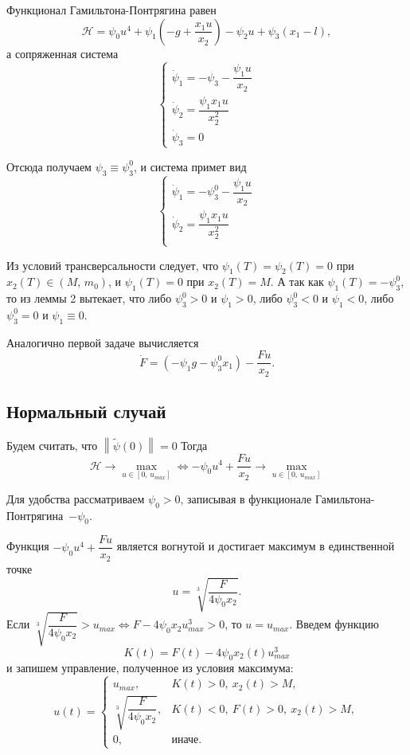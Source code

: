 \documentclass[16pt]{article}
\newcommand\Norm[1]{\left\| #1 \right\|}
\begin{document}
Функционал Гамильтона-Понтрягина равен 
$$\mathcal{H} = \psi_0 u^4 + \psi_1(-g + \dfrac{x_1u}{x_2}) - \psi_2u + \psi_3(x_1 - l),$$
а сопряженная система 
$$
\begin{cases}
\dot{\psi}_1 = -\psi_3 -\dfrac{\psi_1u}{x_2}\\
\dot{\psi}_2 = \dfrac{\psi_1 x_1 u}{x_2^2} \\
\dot{\psi}_3 = 0
\end{cases}
$$

Отсюда получаем $\psi_3 \equiv \psi_3^0$, и система примет вид
\begin{equation}
\begin{cases} \label{2_conj_syst}
\dot{\psi}_1 = -\psi_3^0 -\dfrac{\psi_1u}{x_2}\\
\dot{\psi}_2 = \dfrac{\psi_1 x_1 u}{x_2^2} \\
\end{cases}
\end{equation}

Из условий трансверсальности следует, что $\psi_1(T) = \psi_2(T) = 0$ при $x_2(T) \in (M,\,m_0)$, и
$\psi_1(T) = 0$ при $x_2(T) = M$.
А так как $\psi_1(T) = -\psi_3^0$, то из леммы 2 вытекает, что либо $\psi_3^0 > 0$ и $\psi_1 > 0$, либо $\psi_3^0 < 0$
и $\psi_1 < 0$, либо $\psi_3^0 = 0$ и $\psi_1 \equiv 0$.

Аналогично первой задаче вычисляется
\begin{equation} \label{2_F_ode}
\dot{F} = (-\psi_1g - \psi_3^0 x_1) - \dfrac{Fu}{x_2}.
\end{equation}
\subsection{Нормальный случай}
Будем считать, что $\Norm{\tilde{\psi}(0)} = 0$ Тогда
$$\mathcal{H} \to \max_{u \in [0,\,u_{max}]} \Leftrightarrow -\psi_0u^4 + \dfrac{Fu}{x_2} \to 
\max_{u \in [0,\,u_{max}]}$$

Для удобства рассматриваем $\psi_0 > 0$, записывая в функционале Гамильтона-Понтрягина~$-\psi_0$.

Функция $-\psi_0u^4 + \dfrac{Fu}{x_2}$ является вогнутой и достигает максимум в единственной точке
$$u = \sqrt[3]{\dfrac{F}{4\psi_0x_2}}.$$
Если $\sqrt[3]{\dfrac{F}{4\psi_0x_2}} > u_{max} \Leftrightarrow F - 4\psi_0x_2u_{max}^3 > 0$, то $u = u_{max}$.
Введем функцию $$K(t) = F(t) - 4\psi_0x_2(t)u_{max}^3$$ и запишем управление, полученное из условия максимума:
 \begin{equation} \label{oc_2}
 u(t) = 
 \begin{cases}
 u_{max}, & K(t) > 0,\  x_2(t) > M, \\
 \sqrt[3]{\dfrac{F}{4\psi_0x_2}}, & K(t) < 0,\ F(t) > 0, \ x_2(t) > M, \\
 0, &\text{иначе.}
 \end{cases}
 \end{equation}
\end{document}
